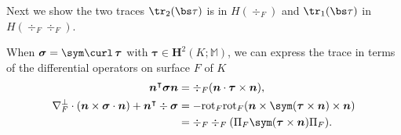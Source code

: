 Next we show the two traces $\tr_2(\bs \tau)$ is in $H(\div_F)$ and $\tr_1(\bs \tau)$ in $H(\div_F\div_F)$. 
\begin{lemma}\label{lm:tracerelation}
When $\boldsymbol \sigma = \sym\curl \, \boldsymbol\tau$ with $\boldsymbol\tau\in\boldsymbol H^2(K;\mathbb M)$, we can express the trace in terms of the differential operators on surface $F$ of $K$
\begin{align}
\label{eq:trace1} \boldsymbol n^{\intercal}\boldsymbol \sigma\boldsymbol n &=\div_F(\boldsymbol n\cdot \boldsymbol \tau\times\boldsymbol n),\\
\label{eq:trace2} \nabla_F^{\bot}\cdot(\boldsymbol n\times\boldsymbol \sigma\cdot\boldsymbol n)+\boldsymbol  n^{\intercal} \div\boldsymbol \sigma  &=-\mathrm{rot}_F\mathrm{rot}_F(\boldsymbol n\times \sym(\boldsymbol\tau\times\boldsymbol n)\times\boldsymbol n)\\
& = \div_F\div_F(\Pi_F \sym(\boldsymbol\tau\times\boldsymbol n) \Pi_F). \notag
\end{align}
\end{lemma}
